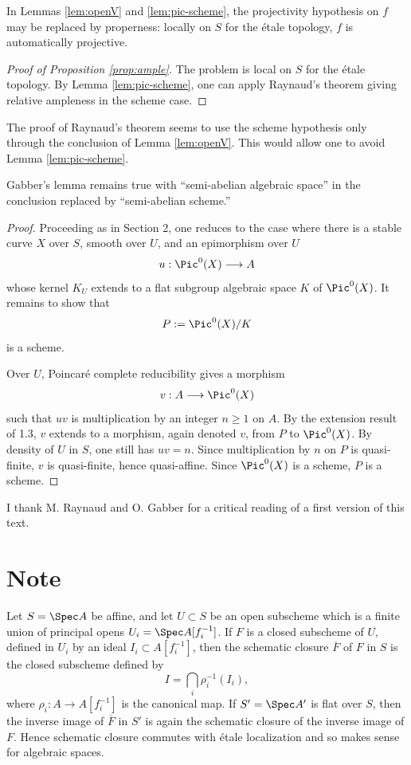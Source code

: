 In Lemmas \ref{lem:openV} and \ref{lem:pic-scheme}, the projectivity hypothesis on $f$ may be replaced by properness: locally on $S$ for the étale topology, $f$ is automatically projective.

\begin{proof}[Proof of Proposition \ref{prop:ample}]
The problem is local on $S$ for the étale topology. By Lemma \ref{lem:pic-scheme}, one can apply Raynaud's theorem giving relative ampleness in the scheme case.
\end{proof}

The proof of Raynaud's theorem seems to use the scheme hypothesis only through the conclusion of Lemma \ref{lem:openV}. This would allow one to avoid Lemma \ref{lem:pic-scheme}.

\begin{proposition}
Gabber's lemma remains true with ``semi-abelian algebraic space'' in the conclusion replaced by ``semi-abelian scheme.''
\end{proposition}

\begin{proof}
Proceeding as in Section 2, one reduces to the case where there is a stable curve $X$ over $S$, smooth over $U$, and an epimorphism over $U$
\[
  u:\Pic^0(X)\longrightarrow A
\]
whose kernel $K_U$ extends to a flat subgroup algebraic space $K$ of $\Pic^0(X)$. It remains to show that
\[
  P:=\Pic^0(X)/K
\]
is a scheme.

Over $U$, Poincaré complete reducibility gives a morphism
\[
  v:A\longrightarrow \Pic^0(X)
\]
such that $uv$ is multiplication by an integer $n\ge1$ on $A$. By the extension result of 1.3, $v$ extends to a morphism, again denoted $v$, from $P$ to $\Pic^0(X)$. By density of $U$ in $S$, one still has $uv=n$. Since multiplication by $n$ on $P$ is quasi-finite, $v$ is quasi-finite, hence quasi-affine. Since $\Pic^0(X)$ is a scheme, $P$ is a scheme.
\end{proof}

I thank M. Raynaud and O. Gabber for a critical reading of a first version of this text.

\section*{Note}

Let $S=\Spec A$ be affine, and let $U\subset S$ be an open subscheme which is a finite union of principal opens $U_i=\Spec A[f_i^{-1}]$. If $F$ is a closed subscheme of $U$, defined in $U_i$ by an ideal $I_i\subset A[f_i^{-1}]$, then the schematic closure $\overline F$ of $F$ in $S$ is the closed subscheme defined by
\[
  I=\bigcap_i \rho_i^{-1}(I_i),
\]
where $\rho_i:A\to A[f_i^{-1}]$ is the canonical map. If $S'=\Spec A'$ is flat over $S$, then the inverse image of $\overline F$ in $S'$ is again the schematic closure of the inverse image of $F$. Hence schematic closure commutes with étale localization and so makes sense for algebraic spaces.

